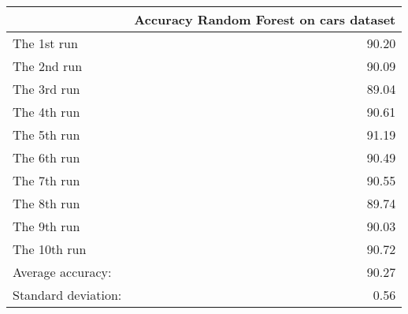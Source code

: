 \begin{tabular}{lr}
\toprule
{} &  Accuracy Random Forest on cars dataset \\
\midrule
The 1st run         &                                   90.20 \\
The 2nd run         &                                   90.09 \\
The 3rd run         &                                   89.04 \\
The 4th run         &                                   90.61 \\
The 5th run         &                                   91.19 \\
The 6th run         &                                   90.49 \\
The 7th run         &                                   90.55 \\
The 8th run         &                                   89.74 \\
The 9th run         &                                   90.03 \\
The 10th run        &                                   90.72 \\
Average accuracy:   &                                   90.27 \\
Standard deviation: &                                    0.56 \\
\bottomrule
\end{tabular}
